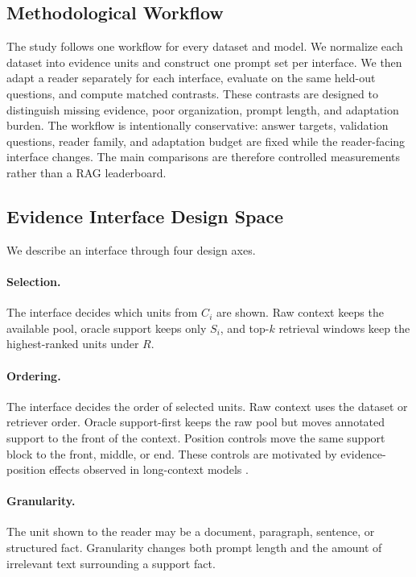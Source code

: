 \documentclass[a4paper,fleqn]{cas-sc}
\begin{document}
\subsection{Methodological Workflow}

The study follows one workflow for every dataset and model. We normalize each
dataset into evidence units and construct one prompt set per interface. We then
adapt a reader separately for each interface, evaluate on the same held-out
questions, and compute matched contrasts. These contrasts are designed to
distinguish missing evidence, poor organization, prompt length, and adaptation
burden. The workflow is intentionally conservative: answer targets, validation
questions, reader family, and adaptation budget are fixed while the
reader-facing interface changes. The main comparisons are therefore controlled
measurements rather than a RAG leaderboard.

\subsection{Evidence Interface Design Space}

We describe an interface through four design axes.

\paragraph{Selection.}
The interface decides which units from $C_i$ are shown. Raw context keeps the
available pool, oracle support keeps only $S_i$, and top-$k$ retrieval windows
keep the highest-ranked units under $R$.

\paragraph{Ordering.}
The interface decides the order of selected units. Raw context uses the dataset
or retriever order. Oracle support-first keeps the raw pool but moves annotated support
to the front of the context. Position controls move the same support block to the
front, middle, or end. These controls are motivated by evidence-position
effects observed in long-context models \citep{liu2023lost}.

\paragraph{Granularity.}
The unit shown to the reader may be a document, paragraph, sentence, or
structured fact. Granularity changes both prompt length and the amount of
irrelevant text surrounding a support fact.
\end{document}
